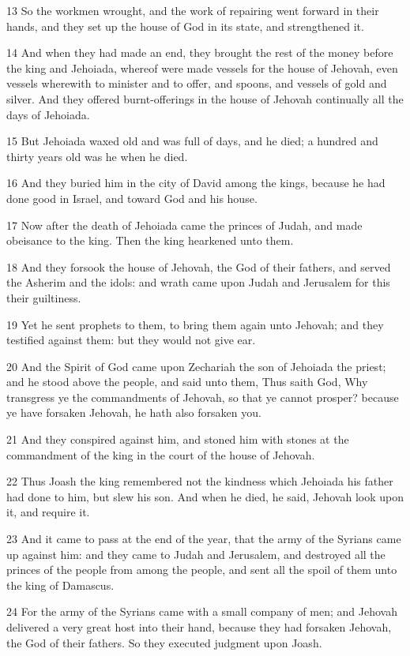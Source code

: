 \par 13 So the workmen wrought, and the work of repairing went forward in their hands, and they set up the house of God in its state, and strengthened it.
\par 14 And when they had made an end, they brought the rest of the money before the king and Jehoiada, whereof were made vessels for the house of Jehovah, even vessels wherewith to minister and to offer, and spoons, and vessels of gold and silver. And they offered burnt-offerings in the house of Jehovah continually all the days of Jehoiada.
\par 15 But Jehoiada waxed old and was full of days, and he died; a hundred and thirty years old was he when he died.
\par 16 And they buried him in the city of David among the kings, because he had done good in Israel, and toward God and his house.
\par 17 Now after the death of Jehoiada came the princes of Judah, and made obeisance to the king. Then the king hearkened unto them.
\par 18 And they forsook the house of Jehovah, the God of their fathers, and served the Asherim and the idols: and wrath came upon Judah and Jerusalem for this their guiltiness.
\par 19 Yet he sent prophets to them, to bring them again unto Jehovah; and they testified against them: but they would not give ear.
\par 20 And the Spirit of God came upon Zechariah the son of Jehoiada the priest; and he stood above the people, and said unto them, Thus saith God, Why transgress ye the commandments of Jehovah, so that ye cannot prosper? because ye have forsaken Jehovah, he hath also forsaken you.
\par 21 And they conspired against him, and stoned him with stones at the commandment of the king in the court of the house of Jehovah.
\par 22 Thus Joash the king remembered not the kindness which Jehoiada his father had done to him, but slew his son. And when he died, he said, Jehovah look upon it, and require it.
\par 23 And it came to pass at the end of the year, that the army of the Syrians came up against him: and they came to Judah and Jerusalem, and destroyed all the princes of the people from among the people, and sent all the spoil of them unto the king of Damascus.
\par 24 For the army of the Syrians came with a small company of men; and Jehovah delivered a very great host into their hand, because they had forsaken Jehovah, the God of their fathers. So they executed judgment upon Joash.
